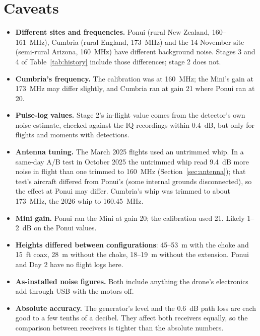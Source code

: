 \documentclass[11pt]{article}
\begin{document}
\section{Caveats}
\begin{itemize}
\item \textbf{Different sites and frequencies.} Ponui (rural New Zealand, 160--161~MHz), Cumbria
(rural England, 173~MHz) and the 14 November site (semi-rural Arizona, 160~MHz) have different
background noise. Stages 3 and 4 of Table~\ref{tab:history} include those differences; stage 2 does
not.
\item \textbf{Cumbria's frequency.} The calibration was at 160~MHz; the Mini's gain at 173~MHz may
differ slightly, and Cumbria ran at gain 21 where Ponui ran at 20.
\item \textbf{Pulse-log values.} Stage 2's in-flight value comes from the detector's own noise
estimate, checked against the IQ recordings within 0.4~dB, but only for flights and moments with
detections.
\item \textbf{Antenna tuning.} The March 2025 flights used an untrimmed whip. In a same-day A/B test in
October 2025 the untrimmed whip read 9.4~dB more noise in flight than one trimmed to 160~MHz
(Section~\ref{sec:antenna}); that test's aircraft differed from Ponui's (some internal grounds
disconnected), so the effect at Ponui may differ. Cumbria's whip was trimmed to about 173~MHz, the
2026 whip to 160.45~MHz.
\item \textbf{Mini gain.} Ponui ran the Mini at gain 20; the calibration used 21. Likely 1--2~dB on
the Ponui values.
\item \textbf{Heights differed between configurations}: 45--53~m with the choke and 15~ft coax, 28~m
without the choke, 18--19~m without the extension. Ponui and Day 2 have no flight logs here.
\item \textbf{As-installed noise figures.} Both include anything the drone's electronics add through
USB with the motors off.
\item \textbf{Absolute accuracy.} The generator's level and the 0.6~dB path loss are each good to a
few tenths of a decibel. They affect both receivers equally, so the comparison between receivers is
tighter than the absolute numbers.
\end{itemize}
\end{document}
